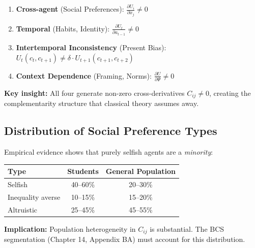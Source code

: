 \begin{tcolorbox}[colback=blue!5!white, colframe=blue!75!black,
    title=\textbf{The Four Interdependencies (Chapter 3)}]

\begin{enumerate}
\item \textbf{Cross-agent} (Social Preferences):
$\displaystyle \frac{\partial U_i}{\partial x_j} \neq 0$

\item \textbf{Temporal} (Habits, Identity):
$\displaystyle \frac{\partial U_t}{\partial a_{t-1}} \neq 0$

\item \textbf{Intertemporal Inconsistency} (Present Bias):
$\displaystyle U_t(c_t, c_{t+1}) \neq \delta \cdot U_{t+1}(c_{t+1}, c_{t+2})$

\item \textbf{Context Dependence} (Framing, Norms):
$\displaystyle \frac{\partial U}{\partial \Psi} \neq 0$
\end{enumerate}

\textbf{Key insight:} All four generate non-zero cross-derivatives $C_{ij} \neq 0$,
creating the complementarity structure that classical theory assumes away.

\end{tcolorbox}

\subsection{Distribution of Social Preference Types}

Empirical evidence shows that purely selfish agents are a \textit{minority}:

\begin{center}
\renewcommand{\arraystretch}{1.2}
\begin{tabular}{lcc}
\toprule
\textbf{Type} & \textbf{Students} & \textbf{General Population} \\
\midrule
Selfish & 40--60\% & 20--30\% \\
Inequality averse & 10--15\% & 15--20\% \\
Altruistic & 25--45\% & 45--55\% \\
\bottomrule
\end{tabular}
\end{center}

\textbf{Implication:} Population heterogeneity in $C_{ij}$ is substantial.
The BCS segmentation (Chapter 14, Appendix BA) must account for this distribution.

